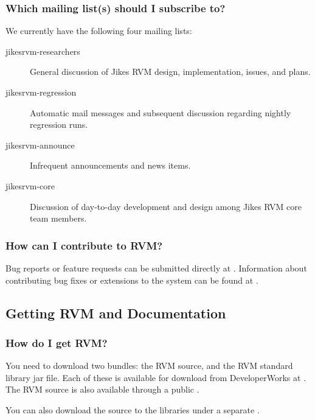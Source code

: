 \subsubsection{Which mailing list(s) should I subscribe to?}

We currently have the following four mailing lists:

\begin{description}
\item[jikesrvm-researchers]
    General discussion of Jikes RVM design, implementation, issues, and
    plans.
\item[jikesrvm-regression]
   Automatic mail messages and subsequent discussion regarding nightly
   regression runs.
\item[jikesrvm-announce]
  Infrequent announcements and news items.
\item[jikesrvm-core]
  Discussion of day-to-day development and design among Jikes RVM  core team
  members.
\end{description}


\subsubsection{How can I contribute to RVM?}
Bug reports or feature requests can be submitted directly at
\xlink{{\tt \RVMBugURL}}{\RVMBugURL}.  
Information about contributing bug fixes or extensions to the system
can be found at
\xlink{{\tt \RVMContribURL}}{\RVMContribURL}.   

\JavaTMFooter

\AIXPPCJikesTMFooter

\subsection{Getting RVM and Documentation}

\subsubsection{How do I get RVM?}

You need to download two bundles: the RVM source, and the RVM standard library
jar file.  Each of these is available for download from DeveloperWorks at
\xlink{{\tt \RVMDownloadURL}}{\RVMDownloadURL}.  
The RVM source is also available through a 
public 
.

You can also download the source to the libraries under
a separate 
.

